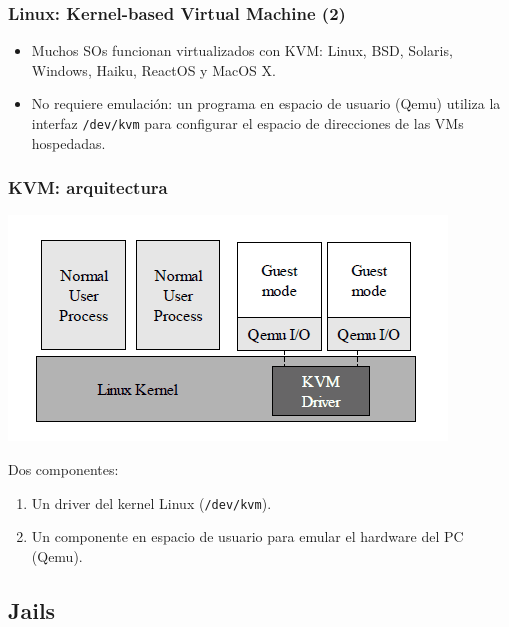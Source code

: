 \documentclass{beamer}
\begin{document}

\begin{frame}
\frametitle{Linux: Kernel-based Virtual Machine (2)}

\begin{itemize}
\item Muchos SOs funcionan virtualizados con KVM: Linux, BSD, Solaris, Windows, Haiku, ReactOS y  MacOS X.
\item No requiere emulación: un programa en espacio de usuario (Qemu) utiliza la interfaz \texttt{/dev/kvm} para configurar el espacio de direcciones de las VMs hospedadas.
\end{itemize}

\end{frame}


\begin{frame}
\frametitle{KVM: arquitectura}

\begin{center}
\includegraphics[scale=0.40,clip=false]{figs/kvm_architecture.png}
\end{center}

Dos componentes:
\begin{enumerate}
\item Un driver del kernel Linux (\texttt{/dev/kvm}).
\item Un componente en espacio de usuario para emular el hardware del PC (Qemu).
\end{enumerate}
\end{frame}



\subsection{Jails}
\end{document}
